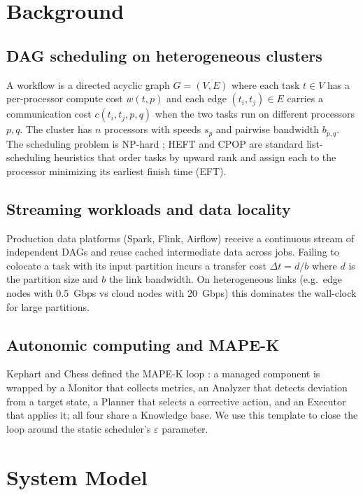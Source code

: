 \documentclass[conference]{IEEEtran}
\begin{document}
\section{Background}

\subsection{DAG scheduling on heterogeneous clusters}
A workflow is a directed acyclic graph \(G=(V,E)\) where each task
\(t \in V\) has a per-processor compute cost \(w(t,p)\) and each edge
\((t_i,t_j) \in E\) carries a communication cost \(c(t_i,t_j,p,q)\) when the
two tasks run on different processors \(p,q\). The cluster has \(n\)
processors with speeds \(s_p\) and pairwise bandwidth \(b_{p,q}\). The
scheduling problem is NP-hard \cite{ullman1975np}; HEFT and CPOP
\cite{topcuoglu2002} are standard list-scheduling heuristics that order tasks
by upward rank and assign each to the processor minimizing its earliest
finish time (EFT).

\subsection{Streaming workloads and data locality}
Production data platforms (Spark, Flink, Airflow) receive a continuous stream
of independent DAGs and reuse cached intermediate data across jobs. Failing
to colocate a task with its input partition incurs a transfer cost
\(\Delta t = d/b\) where \(d\) is the partition size and \(b\) the link
bandwidth. On heterogeneous links (e.g.\ edge nodes with 0.5~Gbps vs cloud
nodes with 20~Gbps) this dominates the wall-clock for large partitions.

\subsection{Autonomic computing and MAPE-K}
Kephart and Chess defined the MAPE-K loop \cite{kephart2003vision}: a managed
component is wrapped by a Monitor that collects metrics, an Analyzer that
detects deviation from a target state, a Planner that selects a corrective
action, and an Executor that applies it; all four share a Knowledge base. We
use this template to close the loop around the static scheduler's
\(\varepsilon\) parameter.

\section{System Model}
\end{document}
